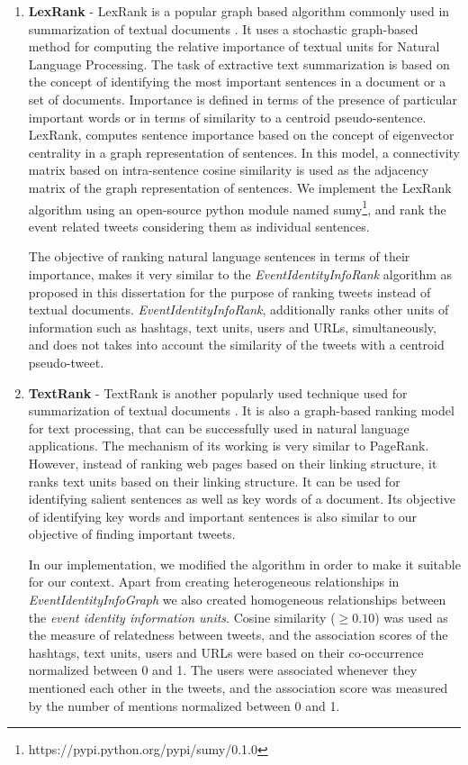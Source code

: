 \begin{enumerate}
\item \textbf{LexRank} - LexRank is a popular graph based algorithm commonly used in summarization of textual documents \cite{erkan2004lexrank}. It uses a stochastic graph-based method for computing the relative importance of textual units for Natural Language Processing. The task of extractive text summarization is based on the concept of identifying the most important sentences in a document or a set of documents. Importance is defined in terms of the presence of particular important words or in terms of similarity to a centroid pseudo-sentence. LexRank, computes sentence importance based on the concept of eigenvector centrality in a graph representation of sentences. In this model, a connectivity matrix based on intra-sentence cosine similarity is used as the adjacency matrix of the graph representation of sentences. We implement the LexRank algorithm using an open-source python module named sumy\footnote{\tiny https://pypi.python.org/pypi/sumy/0.1.0}, and rank the event related tweets considering them as individual sentences.

The objective of ranking natural language sentences in terms of their importance, makes it very similar to the \textit{EventIdentityInfoRank} algorithm as proposed in this dissertation for the purpose of ranking tweets instead of textual documents. \textit{EventIdentityInfoRank}, additionally ranks other units of information such as hashtags, text units, users and URLs, simultaneously, and does not takes into account the similarity of the tweets with a centroid pseudo-tweet. 

\item \textbf{TextRank} - TextRank is another popularly used technique used for summarization of textual documents \cite{Mihalcea2004}.  It is also a graph-based
ranking model for text processing, that can be successfully used in natural language
applications. The mechanism of its working is very similar to PageRank. However, instead of ranking web pages based on their linking structure, it ranks text units based on their linking structure. It can be used for identifying salient sentences as well as key words of a document. Its objective of identifying key words and important sentences is also similar to our objective of finding important tweets.

In our implementation, we modified the algorithm in order to make it suitable for our context. Apart from creating heterogeneous relationships in \textit{EventIdentityInfoGraph} we also created homogeneous relationships between the \textit{event identity information units}. Cosine similarity ($ \ge 0.10$) was used as the measure of relatedness between tweets, and the association scores of the hashtags, text units, users and URLs were based on their co-occurrence normalized between 0 and 1. The users were associated whenever they mentioned each other in the tweets, and the association score was measured by the number of mentions normalized between 0 and 1.



\end{enumerate}
